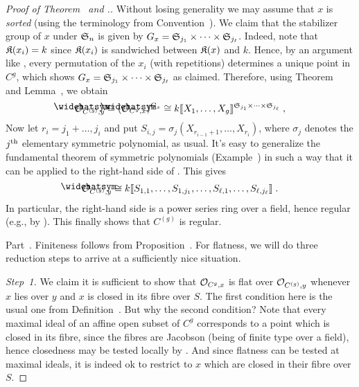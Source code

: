 \documentclass[a4paper,parskip=half,numbers=enddot, DIV=12]{scrreprt}
\begin{document}
\begin{proof}[Proof of Theorem~ and .]
	Without losing generality we may assume that $x$ is \emph{sorted} (using the terminology from Convention~). We claim that the stabilizer group of $x$ under $\mathfrak{S}_n$ is given by $G_x=\mathfrak{S}_{j_1}\times\cdots\times\mathfrak{S}_{j_\ell}$. Indeed, note that $\mathfrak{K}(x_i)=k$ since $\mathfrak{K}(x_i)$ is sandwiched between $\mathfrak{K}(x)$ and $k$. Hence, by an argument like , every permutation of the $x_i$ (with repetitions) determines a unique point in $C^g$, which shows $G_x=\mathfrak{S}_{j_1}\times\cdots\times\mathfrak{S}_{j_\ell}$ as claimed. Therefore, using Theorem~ and Lemma~, we obtain
	\begin{align}\lbl{eq:OCgx}
		\roof{\Oo}_{C^{(g)},y}\cong (\roof{\Oo}_{C^g,x})^{G_x}\cong k\llbracket X_1,\ldots,X_g\rrbracket^{\SS_{j_1}\times\cdots\times\SS_{j_\ell}}\;,
	\end{align}
	Now let $r_i=j_1+\ldots,j_i$ and put $S_{i,j}=\sigma_j\left(X_{r_{i-1}+1},\ldots,X_{r_i}\right)$, where $\sigma_j$ denotes the $j^{\text{th}}$ elementary symmetric polynomial, as usual. 
	It's easy to generalize the fundamental theorem of symmetric polynomials (Example~) in such a way that it can be applied to the right-hand side of . This gives
	\begin{align}\lbl{eq:OCgx2}
		\roof{\Oo}_{C^{(g)},y}\cong k\llbracket S_{1,1},\ldots,S_{1,j_1},\ldots,S_{\ell,1},\ldots,S_{\ell,j_\ell}\rrbracket\;.
	\end{align}
	In particular, the right-hand side is a power series ring over a field, hence regular (e.g., by \cite[Proposition~2.2.3]{homalg}). This finally shows that $C^{(g)}$ is regular.	
	
	Part~. Finiteness follows from Proposition~. For flatness, we will do three reduction steps to arrive at a sufficiently nice situation.
	
	\emph{Step~1.} We claim it is sufficient to show that $\mathcal{O}_{C^g,x}$ is flat over $\mathcal{O}_{C^{(g)},y}$ whenever $x$ lies over $y$ and $x$ is closed in its fibre over $S$. The first condition here is the usual one from Definition~. But why the second condition? Note that every maximal ideal of an affine open subset of $C^g$ corresponds to a point which is closed in its fibre, since the fibres are Jacobson (being of finite type over a field), hence closedness may be tested locally by \cite[Fact~2.4.1]{alggeo1}. And since flatness can be tested at maximal ideals, it is indeed ok to restrict to $x$ which are closed in their fibre over $S$.
	

\end{proof}
\end{document}

